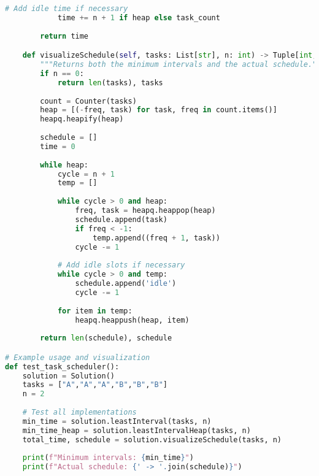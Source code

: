 \begin{fullwidth}
\begin{lstlisting}[language=Python]
            # Add idle time if necessary
            time += n + 1 if heap else task_count
            
        return time

    def visualizeSchedule(self, tasks: List[str], n: int) -> Tuple[int, List[str]]:
        """Returns both the minimum intervals and the actual schedule."""
        if n == 0:
            return len(tasks), tasks
            
        count = Counter(tasks)
        heap = [(-freq, task) for task, freq in count.items()]
        heapq.heapify(heap)
        
        schedule = []
        time = 0
        
        while heap:
            cycle = n + 1
            temp = []
            
            while cycle > 0 and heap:
                freq, task = heapq.heappop(heap)
                schedule.append(task)
                if freq < -1:
                    temp.append((freq + 1, task))
                cycle -= 1
            
            # Add idle slots if necessary
            while cycle > 0 and temp:
                schedule.append('idle')
                cycle -= 1
                
            for item in temp:
                heapq.heappush(heap, item)
                
        return len(schedule), schedule

# Example usage and visualization
def test_task_scheduler():
    solution = Solution()
    tasks = ["A","A","A","B","B","B"]
    n = 2
    
    # Test all implementations
    min_time = solution.leastInterval(tasks, n)
    min_time_heap = solution.leastIntervalHeap(tasks, n)
    total_time, schedule = solution.visualizeSchedule(tasks, n)
    
    print(f"Minimum intervals: {min_time}")
    print(f"Actual schedule: {' -> '.join(schedule)}")
\end{lstlisting}
\end{fullwidth}

